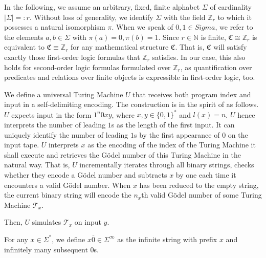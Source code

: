 In the following, we assume an arbitrary, fixed, finite alphabet $\Sigma$ of cardinality $|\Sigma|=:r$.
Without loss of generality, we identify $\Sigma$ with the field $\mathbb{Z}_r$ to which it possesses a natural isomorphism $\pi$.
When we speak of $0,1\in Sigma$, we refer to the elements $a,b\in\Sigma$ with $\pi(a)=0, \pi(b)=1$.
Since $r\in\mathbb{N}$ is finite, $\mathfrak{C}\cong \mathbb{Z}_r$ is equivalent to $\mathfrak{C}\equiv \mathbb{Z}_r$ for any mathematical structure $\mathfrak{C}$.
That is, $\mathfrak{C}$ will satisfy exactly those first-order logic formulas that $\mathbb{Z}_r$ satisfies.
In our case, this also holds for second-order logic formulas formulated over $\mathbb{Z}_r$, as quantification over predicates and relations over finite objects is expressible in first-order logic, too.

\begin{definition}
	\label{def:universaltm}
	We define a universal Turing Machine $U$ that receives both program index and input in a self-delimiting encoding.
	The construction is in the spirit of \cite[Section 2.1]{li2008kolmogorov} as follows. 
	$U$ expects input in the form $1^n 0 xy$, where $x,y\in\{0,1\}^{*}$ and $l(x)=n$.
	$U$ hence interprets the number of leading $1$s as the length of the first input.
	It can uniquely identify the number of leading $1$s by the first appearance of $0$ on the input tape.
	$U$ interprets $x$ as the encoding of the index of the Turing Machine it shall execute and retrieves the Gödel number of this Turing Machine in the natural way.
	That is, $U$ incrementally iterates through all binary strings, checks whether they encode a Gödel number and subtracts $x$ by one each time it encounters a valid Gödel number.
	When $x$ has been reduced to the empty string, the current binary string will encode the $n_x$th valid Gödel number of some Turing Machine $\mathcal{T}_x$. 
	
	Then, $U$ simulates $\mathcal{T}_x$ on input $y$.
\end{definition}

\begin{definition}
	\label{def:zero-pad-string}
	For any $x\in\Sigma^{*}$, we define $x\overline{0}\in\Sigma^{\infty}$ as the infinite string with prefix $x$ and infinitely many subsequent $0$s.
\end{definition}


